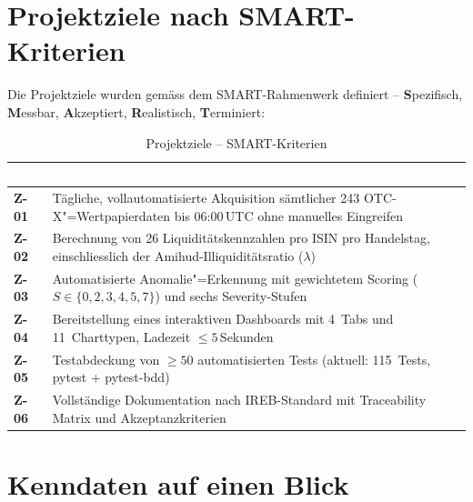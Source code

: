 \documentclass[11pt, a4paper, oneside, openany]{report}
\begin{document}
\section{Projektziele nach SMART-Kriterien}
\label{sec:projektziele}

Die Projektziele wurden gemäss dem SMART-Rahmenwerk definiert -- \textbf{S}pezifisch, \textbf{M}essbar, \textbf{A}kzeptiert, \textbf{R}ealistisch, \textbf{T}erminiert:

\begin{table}[H]
\centering
\caption{Projektziele -- SMART-Kriterien}
\label{tab:smart}
\sffamily\small
\begin{tabularx}{\textwidth}{>{\bfseries\sffamily\color{SwissRed}}l X}
  \toprule
  \rowcolor{DeepNavy} \textcolor{white}{\textbf{Ziel}} & \textcolor{white}{\textbf{Beschreibung \& Messkriterium}} \\
  \midrule
  Z-01 & Tägliche, vollautomatisierte Akquisition sämtlicher 243 OTC-X"=Wertpapierdaten bis 06:00\,UTC ohne manuelles Eingreifen \\
  Z-02 & Berechnung von 26 Liquiditätskennzahlen pro ISIN pro Handelstag, einschliesslich der Amihud-Illiquiditätsratio ($\lambda$) \\
  Z-03 & Automatisierte Anomalie"=Erkennung mit gewichtetem Scoring ($S \in \{0,2,3,4,5,7\}$) und sechs Severity-Stufen \\
  Z-04 & Bereitstellung eines interaktiven Dashboards mit 4~Tabs und 11~Charttypen, Ladezeit $\leq 5$\,Sekunden \\
  Z-05 & Testabdeckung von $\geq 50$ automatisierten Tests (aktuell: 115~Tests, pytest + pytest-bdd) \\
  Z-06 & Vollständige Dokumentation nach IREB-Standard mit Traceability Matrix und Akzeptanzkriterien \\
  \bottomrule
\end{tabularx}
\end{table}

\section{Kenndaten auf einen Blick}
\label{sec:kenndaten}
\end{document}
